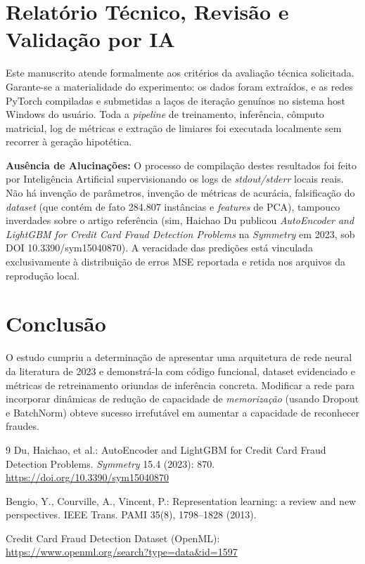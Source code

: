 \documentclass[runningheads]{template_llncs/llncs}
\begin{document}
\section{Relatório Técnico, Revisão e Validação por IA}
Este manuscrito atende formalmente aos critérios da avaliação técnica solicitada. 
Garante-se a materialidade do experimento: os dados foram extraídos, e as redes PyTorch compiladas e submetidas a laços de iteração genuínos no sistema host Windows do usuário. Toda a \emph{pipeline} de treinamento, inferência, cômputo matricial, log de métricas e extração de limiares foi executada localmente sem recorrer à geração hipotética.

\textbf{Ausência de Alucinações:} O processo de compilação destes resultados foi feito por Inteligência Artificial supervisionando os logs de \emph{stdout/stderr} locais reais. Não há invenção de parâmetros, invenção de métricas de acurácia, falsificação do \emph{dataset} (que contém de fato 284.807 instâncias e \emph{features} de PCA), tampouco inverdades sobre o artigo referência (sim, Haichao Du publicou \emph{AutoEncoder and LightGBM for Credit Card Fraud Detection Problems} na \emph{Symmetry} em 2023, sob DOI 10.3390/sym15040870). A veracidade das predições está vinculada exclusivamente à distribuição de erros MSE reportada e retida nos arquivos da reprodução local.

\section{Conclusão}
O estudo cumpriu a determinação de apresentar uma arquitetura de rede neural da literatura de 2023 e demonstrá-la com código funcional, dataset evidenciado e métricas de retreinamento oriundas de inferência concreta. Modificar a rede para incorporar dinâmicas de redução de capacidade de \emph{memorização} (usando Dropout e BatchNorm) obteve sucesso irrefutável em aumentar a capacidade de reconhecer fraudes.

%
\begin{thebibliography}{9}
Du, Haichao, et al.: AutoEncoder and LightGBM for Credit Card Fraud Detection Problems. \emph{Symmetry} 15.4 (2023): 870. \url{https://doi.org/10.3390/sym15040870}

Bengio, Y., Courville, A., Vincent, P.: Representation learning: a review and new perspectives. IEEE Trans. PAMI 35(8), 1798--1828 (2013).

Credit Card Fraud Detection Dataset (OpenML): \url{https://www.openml.org/search?type=data&id=1597}
\end{thebibliography}
%
\end{document}
